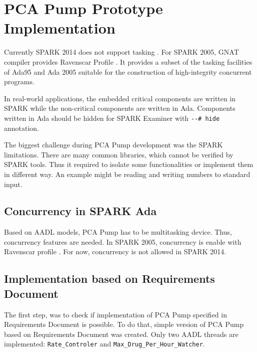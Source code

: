 
\cleardoublepage


\chapter{PCA Pump Prototype Implementation}
\label{pcapumpimpl}

Currently SPARK 2014 does not support tasking \cite{Spark2014refManual:Online}. For SPARK 2005, GNAT compiler provides Ravenscar Profile \cite{Ravenscar:Online}. It provides a subset of the tasking facilities of Ada95 and Ada 2005 suitable for the construction of high-integrity concurrent programs.

In real-world applications, the embedded critical components are written in SPARK while the non-critical components are written in Ada. Components written in Ada should be hidden for SPARK Examiner with \lstinline{--# hide} annotation.

The biggest challenge during PCA Pump development was the SPARK limitations. There are many common libraries, which cannot be verified by SPARK tools. Thus it required to isolate some functionalities or implement them in different way. An example might be reading and writing numbers to standard input.


\section{Concurrency in SPARK Ada}
\label{pcapump:implementation:concurrency}

Based on AADL models, PCA Pump has to be multitasking device. Thus, concurrency features are needed. In SPARK 2005, concurrency is enable with Ravenscar profile \cite{Ravenscar:Online}. For now, concurrency is not allowed in SPARK 2014.





\section{Implementation based on Requirements Document}

The first step, was to check if implementation of PCA Pump specified in Requirements Document is possible. To do that, simple version of PCA Pump based on Requirements Document was created. Only two AADL threads are implemented: \lstinline{Rate_Controler} and \lstinline{Max_Drug_Per_Hour_Watcher}.



